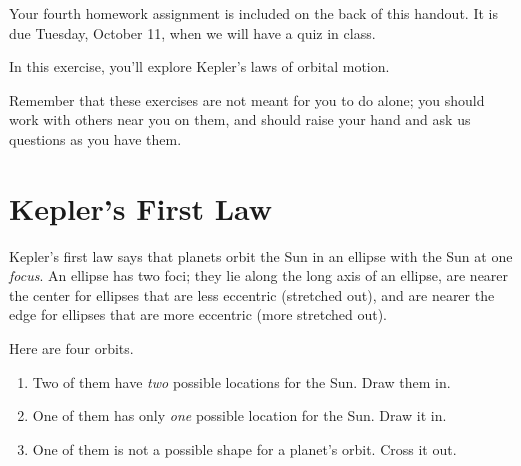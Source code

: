 \documentclass[12pt]{article}
\begin{document}
\Large
\centerline{}

\normalsize

Your fourth homework assignment is included on the back of this handout. It is due Tuesday, October 11, when we will have a quiz in class.

In this exercise, you'll explore Kepler's laws of orbital motion.

Remember that these exercises are not meant for you to do alone; you should work with others near you on them, and should raise your hand and ask us questions as you have them.



\bigskip\bigskip

\section{Kepler's First Law}

Kepler's first law says that planets orbit the Sun in an ellipse with the Sun at one {\it focus}. An ellipse has two foci; they lie along the long axis of an ellipse, are nearer the center for ellipses that are less eccentric (stretched out), and are nearer the edge for ellipses that are more eccentric (more stretched out).

Here are four orbits.

\begin{enumerate}
	\item Two of them have {\it two} possible locations for the Sun. Draw them in.
	\item One of them has only {\it one} possible location for the Sun. Draw it in.
	\item One of them is not a possible shape for a planet's orbit. Cross it out.
\end{enumerate}
\end{document}
